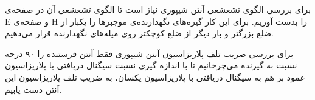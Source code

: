 \documentclass[logo=images/logo.png]{tehranReport}
\begin{document}
	برای بررسی الگوی تشعشعی آنتن شیپوری نیاز است تا الگوی تشعشعی آن در صفحه‌ی E و صفحه‌ی H را بدست آوریم. برای این کار گیره‌های نگهدارنده‌ی موجبرها را یکبار از ضلع بزرگتر و بار دیگر از ضلع کوچکتر روی میله‌های نگهدارنده قرار می‌دهیم.
	
	برای بررسی ضریب تلف پلاریزاسیون آنتن شیپوری فقط آنتن فرستنده را ۹۰ درجه نسبت به گیرنده می‌چرخانیم تا با اندازه گیری نسبت سیگنال دریافتی با پلاریزاسیون عمود بر هم به سیگنال دریافتی با پلاریزاسیون یکسان، به ضریب تلف پلاریزاسیون این آنتن دست یابیم. 
\end{document}
